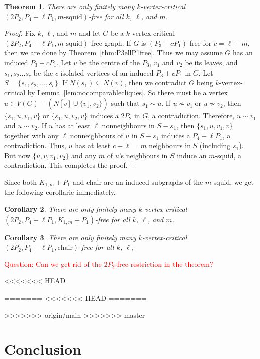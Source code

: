 \documentclass[11pt]{article}
\newtheorem{theorem}{Theorem}[section]
\newtheorem{corollary}[theorem]{Corollary}
\theoremstyle{definition}
\newcommand{\noneighbs}{\overline{N[v]}}
\begin{document}
\begin{theorem}
There are only finitely many $k$-vertex-critical $(2P_2,P_4+\ell P_1,m\text{-squid})$-free for all $k$, $\ell$, and $m$.
\end{theorem}
\begin{proof}
Fix $k$, $\ell$, and $m$ and let $G$ be a $k$-vertex-critical $(2P_2,P_4+\ell P_1,m\text{-squid})$-free graph. If $G$ is $(P_3+c P_1)$-free for $c= \ell+m$, then we are done by Theorem~\ref{thm:P3ellP1free}. Thus we may assume $G$ has an induced $P_3+c P_1$. Let $v$ be the centre of the $P_3$, $v_1$ and $v_2$ be its leaves, and $s_1,s_2\ldots s_c$ be the $c$ isolated vertices of an induced $P_3+c P_1$ in $G$. Let $S=\{s_1,s_2,\dots,s_c\}$. If $N(s_1)\subseteq N(v)$, then we contradict $G$ being $k$-vertex-critical by Lemma~\ref{lem:nocomparablecliques}. So there must be a vertex $u\in V(G)-(\noneighbs\cup \{v_1,v_2\})$ such that $s_1\sim u$. If $u\nsim v_1$ or $u\nsim v_2$, then $\{s_1,u,v_1,v\}$ or $\{s_1,u,v_2,v\}$ induces a $2P_2$ in $G$, a contradiction. Therefore, $u\sim v_1$ and $u\sim v_2$. If $u$ has at least $\ell$ nonneighbours in $S-s_1$, then $\{s_1,u,v_1,v\}$ together with any $\ell$ nonneighbours of $u$ in  $S-s_1$ induces a $P_4+\ell P_1$, a contradiction. Thus, $u$ has at least $c-\ell=m$ neighbours in $S$ (including $s_1$). But now $\{u,v,v_1,v_2\}$ and any $m$ of $u$'s neighbours in $S$ induce an $m$-squid, a contradiction. This completes the proof.
\end{proof}

Since both $K_{1,m}+P_1$ and chair are an induced subgraphs of the $m$-squid, we get the following corollarie immediately.

\begin{corollary}
There are only finitely many $k$-vertex-critical $(2P_2,P_4+\ell P_1,K_{1,m}+P_1)$-free for all $k$, $\ell$, and $m$.
\end{corollary}

\begin{corollary}
There are only finitely many $k$-vertex-critical $(2P_2,P_4+\ell P_1,\text{chair})$-free for all $k$, $\ell$,
\end{corollary}




\textcolor{red}{Question: Can we get rid of the $2P_2$-free restriction in the theorem?}

<<<<<<< HEAD

=======
<<<<<<< HEAD
=======

>>>>>>> origin/main
>>>>>>> master
\section{Conclusion}
\end{document}
